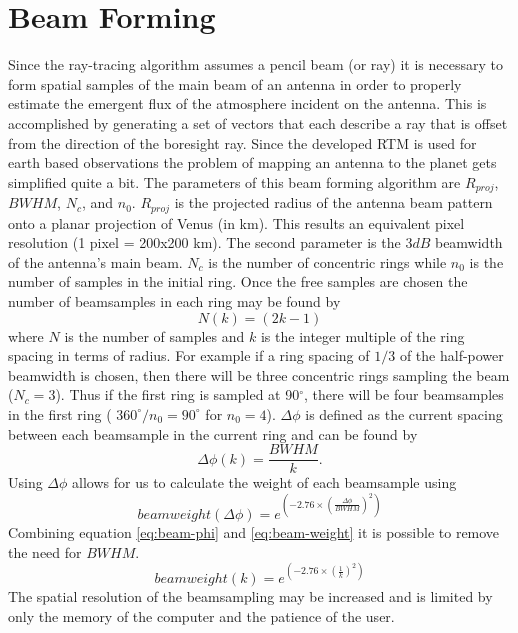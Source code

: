 \section{Beam Forming}

Since the ray-tracing algorithm assumes a pencil beam (or ray) it is necessary to form spatial samples of the main beam of an antenna in order to properly estimate the emergent flux of the atmosphere incident on the antenna. This is accomplished by generating a set of vectors that each describe a ray that is offset from the direction of the boresight ray. Since the developed RTM is used for earth based observations the problem of mapping an antenna to the planet gets simplified quite a bit. The parameters of this beam forming algorithm are $R_{proj}$, $BWHM$, $N_c$, and $n_0$. $R_{proj}$ is the projected radius of the antenna beam pattern onto a planar projection of Venus (in km). This results an equivalent pixel resolution (1 pixel = 200x200 km). The second parameter is the $3dB$ beamwidth of the antenna's main beam. $N_c$ is the number of concentric rings while $n_0$ is the number of samples in the initial ring. Once the free samples are chosen the number of beamsamples in each ring may be found by
\begin{equation}
N(k) = (2k-1)
\end{equation} %
where $N$ is the number of samples and $k$ is the integer multiple of the ring spacing in terms of radius. For example if a ring spacing of $1/3$ of the half-power beamwidth is chosen, then there will be three concentric rings sampling the beam ($N_c=3$). Thus if the first ring is sampled at 90$^\circ$, there will be four beamsamples in the first ring ( $360^\circ / n_0 = 90^\circ$ for $n_0 = 4$). $\Delta\phi$ is defined as the current spacing between each beamsample in the current ring and can be found by
\begin{equation}\label{eq:beam-phi}
\Delta\phi(k) = \frac{BWHM}{k}.
\end{equation} 
Using $\Delta\phi$ allows for us to calculate the weight of each beamsample using
\begin{equation} \label{eq:beam-weight}
beamweight(\Delta\phi) = e^{\left( -2.76\times \left(\frac{\Delta\phi}{BWHM}\right)^2\right)}
\end{equation}
Combining equation \ref{eq:beam-phi} and \ref{eq:beam-weight} it is possible to remove the need for $BWHM$.
\begin{equation}
beamweight(k) = e^{\left( -2.76\times \left(\frac{1}{k}\right)^2\right)}
\end{equation}
The spatial resolution of the beamsampling may be increased and is limited by only the memory of the computer and the patience of the user. 